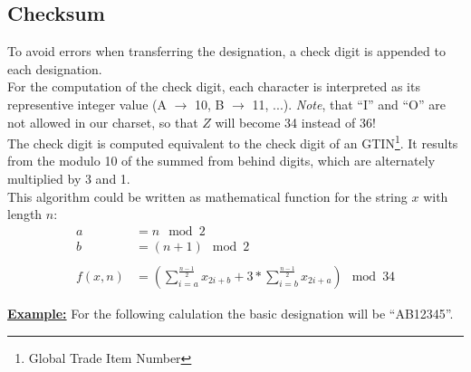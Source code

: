 %
%
%
%
%
%
%

\subsection{Checksum}

To avoid errors when transferring the designation, a check digit is appended to
each designation. \\

For the computation of the check digit, each character is interpreted as its
representive integer value (A $\rightarrow$ 10, B $\rightarrow$ 11, ...).
\textit{Note}, that ``I'' and ``O'' are not allowed in our charset, so that $Z$
will become 34 instead of 36! \\

The check digit is computed equivalent to the check digit of an
GTIN\footnote{Global Trade Item Number}. It results from the modulo 10 of the
summed from behind digits, which are alternately multiplied by 3 and 1. \\



This algorithm could be written as mathematical function for the string $x$ with
length $n$:
\begin{align*}
	a &= n \mod 2 \\
	b &= (n + 1) \mod 2 \\
	\\
	f(x, n) &= \left(\sum_{i = a}^{\frac{n - 1}{2}} x_{2i + b}
		+ 3 * \sum_{i = b}^{\frac{n - 1}{2}} x_{2i + a}\right)
		\mod 34
\end{align*}





\textbf{\underline{Example:}}
For the following calulation the basic designation will be ``AB12345''.

